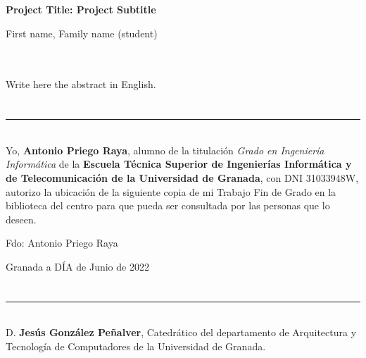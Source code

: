 \thispagestyle{empty}


\begin{center}
{\large\bfseries Project Title: Project Subtitle}\\
\end{center}
\begin{center}
First name, Family name (student)\\
\end{center}

\\

\vspace{0.7cm}
\\

Write here the abstract in English.

\chapter*{}
\thispagestyle{empty}

\noindent\rule[-1ex]{\textwidth}{2pt}\\[4.5ex]

Yo, \textbf{Antonio Priego Raya}, alumno de la titulación \textit{Grado en Ingeniería Informática}
de la \textbf{Escuela Técnica Superior
de Ingenierías Informática y de Telecomunicación de la Universidad de Granada}, con DNI 31033948W, autorizo la
ubicación de la siguiente copia de mi Trabajo Fin de Grado en la biblioteca del centro para que pueda ser
consultada por las personas que lo deseen.

\vspace{6cm}

\noindent Fdo: Antonio Priego Raya

\vspace{2cm}

\begin{flushright}
Granada a DÍA de Junio de 2022
\end{flushright}


\chapter*{}
\thispagestyle{empty}

\noindent\rule[-1ex]{\textwidth}{2pt}\\[4.5ex]

D. \textbf{Jesús González Peñalver}, Catedrático del departamento de Arquitectura y Tecnología de Computadores de la Universidad de Granada.


